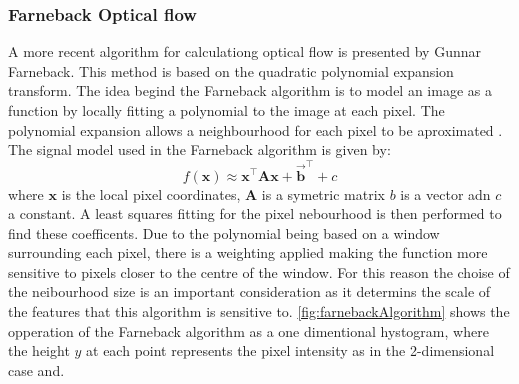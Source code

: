 \documentclass{UoNMCHA}
\numberwithin{equation}{section}
\begin{document}
\subsubsection{Farneback Optical flow}
A more recent algorithm for calculationg optical flow is presented by Gunnar Farneback. This method is based on the quadratic polynomial expansion transform. The idea begind the Farneback algorithm is to model an image as a function by locally fitting a polynomial to the image at each pixel. The polynomial expansion allows a neighbourhood for each pixel to be aproximated \cite{farneback2003two}. The signal model used in the Farneback algorithm is given by:
\begin{equation}
	f(\mathbf{x}) \approx \mathbf{x}^{\top}\mathbf{A}\mathbf{x} + \mathbf{\vec{b}}^{\top} + c
\end{equation}
where $\mathbf{x}$ is the local pixel coordinates, $\mathbf{A}$ is a symetric matrix $b$ is a vector adn $c$ a constant. A least squares fitting for the pixel nebourhood is then performed to find these coefficents. Due to the polynomial being based on a window surrounding each pixel, there is a weighting applied making the function more sensitive to pixels closer to the centre of the window. For this reason the choise of the neibourhood size is an important consideration as it determins the scale of the features that this algorithm is sensitive to. \cref{fig:farnebackAlgorithm} shows the opperation of the Farneback algorithm as a one dimentional hystogram, where the height $y$ at each point represents the pixel intensity as in the 2-dimensional case and.
\end{document}
